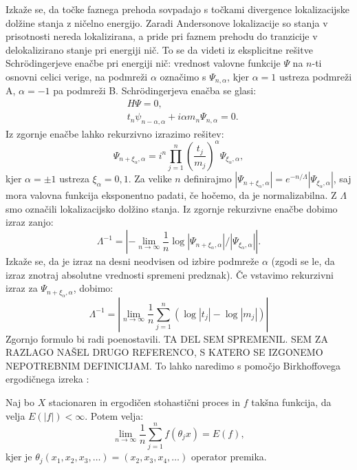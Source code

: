 Izkaže se, da točke faznega prehoda sovpadajo s točkami divergence lokalizacijske dolžine stanja z ničelno energijo. Zaradi Andersonove lokalizacije so stanja v prisotnosti nereda lokalizirana, a pride pri faznem prehodu do tranzicije v delokalizirano stanje pri energiji nič.
To se da videti iz eksplicitne rešitve Schrödingerjeve enačbe pri energiji nič:
vrednost valovne funkcije $\Psi$ na $n$-ti osnovni celici verige, na podmreži $\alpha$ označimo s $\Psi_{n, \alpha}$, kjer $\alpha=1$ ustreza podmreži A, $\alpha=-1$ pa podmreži B.
Schrödingerjeva enačba se glasi:
\begin{align}
&H \Psi = 0, \\
&t_n \psi_{n-\alpha, \alpha} + i \alpha m_n \Psi_{n, \alpha} = 0.
\end{align}
Iz zgornje enačbe lahko rekurzivno izrazimo rešitev:
\begin{equation}
\Psi_{n+\xi_\alpha, \alpha} = i^n \prod_{j=1}^n \left( \frac{t_j}{m_j} \right)^\alpha \Psi_{\xi_\alpha,\alpha},
\end{equation}
kjer $\alpha = \pm 1$ ustreza $\xi_\alpha = 0, 1$.
Za velike $n$ definirajmo $|\Psi_{n+\xi_\alpha, \alpha}| = e^{-n/\Lambda } |\Psi_{\xi_\alpha, \alpha}|$, saj mora valovna funkcija eksponentno padati, če hočemo, da je normalizabilna. Z $\Lambda$ smo označili lokalizacijsko dolžino stanja.
Iz zgornje rekurzivne enačbe dobimo izraz zanjo:
\begin{equation}
\Lambda^{-1} = \left| - \lim_{n \to \infty} \frac{1}{n} \log |\Psi_{n+ \xi_\alpha, \alpha}| / |\Psi_{\xi_\alpha, \alpha}| \right|.
\end{equation}
Izkaže se, da je izraz na desni neodvisen od izbire podmreže $\alpha$ (zgodi se le, da izraz znotraj absolutne vrednosti spremeni predznak).
Če vstavimo rekurzivni izraz za $\Psi_{n+ \xi_\alpha, \alpha}$, dobimo:
\begin{equation} \label{empiricnalok}
\Lambda^{-1} = \left| \lim_{n \to \infty} \frac{1}{n} \sum_{j=1}^n ( \log |t_j| - \log |m_j| ) \right| 
\end{equation}
Zgornjo formulo bi radi poenostavili. 
TA DEL SEM SPREMENIL. SEM ZA RAZLAGO NAŠEL DRUGO REFERENCO, S KATERO SE IZGONEMO NEPOTREBNIM DEFINICIJAM.
To lahko naredimo s pomočjo Birkhoffovega ergodičnega izreka \cite{birkhoff}:
\begin{theorem*}
Naj bo $X$ stacionaren in ergodičen stohastični proces in $f$ takšna funkcija, da velja $E(|f|) < \infty$. Potem velja:
\begin{equation}
\lim_{n \to \infty} \frac{1}{n} \sum_{j=1}^{n} f(\theta_j x) = E(f),
\end{equation}
kjer je $\theta_j (x_1,x_2,x_3, \dots) = (x_2,x_3,x_4, \dots)$ operator premika.
\end{theorem*}
